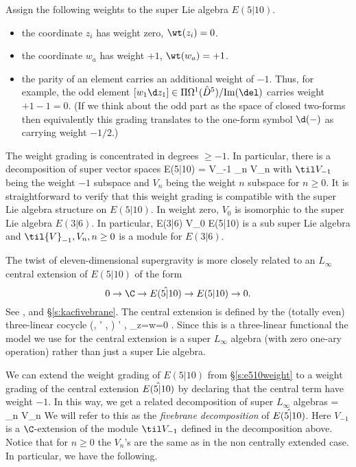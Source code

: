 Assign the following weights to the super Lie algebra $E(5|10)$. 
\begin{itemize} 
\item the coordinate $z_i$ has weight zero, $\wt(z_i) = 0$. 
\item the coordinate $w_a$ has weight $+1$, $\wt(w_a) = +1$. 
\item the parity of an element carries an additional weight of $-1$. 
Thus, for example, the odd element $[w_1 \d z_1] \in \Pi \Omega^1(\Hat{D}^5)/{\rm Im}(\del)$ carries weight $+1 - 1 = 0$. 
(If we think about the odd part as the space of closed two-forms then equivalently this grading translates to the one-form symbol $\d(-)$ as carrying weight $-1/2$.)
\end{itemize} 
The weight grading is concentrated in degrees $\geq -1$. 
In particular, there is a decomposition of super vector spaces
\beqn\label{eqn:decomp1}
E(5|10) = \til V_{-1} \times \prod_{n } V_n 
\eeqn
with $\til V_{-1}$ being the weight $-1$ subspace and $V_n$ being the weight $n$ subspace for $n \geq 0$.  
It is straightforward to verify that this weight grading is compatible with the super Lie algebra structure on $E(5|10)$. 
In weight zero, $V_0$ is isomorphic to the super Lie algebra $E(3|6)$.
In particular, 
\beqn 
\label{eqn:e36iso}
E(3|6) \cong V_0 \subset E(5|10)
\eeqn
is a sub super Lie algebra and $\til{V}_{-1}, V_n, n \geq 0$ is a module for $E(3|6)$. 

\parsec[s:e510central]

The twist of eleven-dimensional supergravity is more closely related to an $L_\infty$ central extension of $E(5|10)$ of the form
\[
0 \to \C \to \Hat{E(5|10)} \to E(5|10) \to 0 .
\]
See \cite[\S 3]{RSW}, and \S \ref{s:kacfivebrane}.
The central extension is defined by the (totally even) three-linear cocycle
\beqn\label{eqn:e510central}
(\mu, \mu' , \alpha) \mapsto \<\mu \wedge \mu' , \alpha\>_{z=w=0} \in \C .
\eeqn
Since this is a three-linear functional the model we use for the central extension is a super $L_\infty$ algebra (with zero one-ary operation) rather than just a super Lie algebra.

We can extend the weight grading of $E(5|10)$ from \S \ref{s:e510weight} to a weight grading of the central extension $\Hat{E(5|10)}$ by declaring that the central term have weight $-1$.
In this way, we get a related decomposition of super $L_\infty$ algebras
\beqn\label{eqn:decomp1}
 = \prod_{n } V_n
\eeqn
We will refer to this as the \textit{fivebrane decomposition} of $\Hat{E(5|10)}$.
Here $V_{-1}$ is a $\C$-extension of the module $\til V_{-1}$ defined in the decomposition above.
Notice that for $n \geq 0$ the $V_n$'s are the same as in the non centrally extended case.
In particular, we have the following. 

